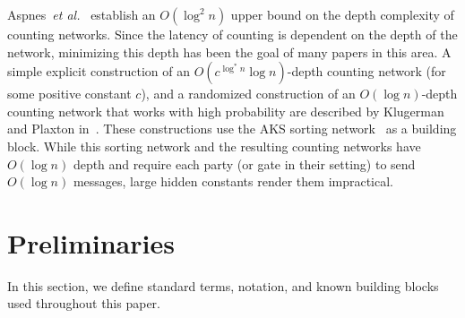 \documentclass[11pt,letter]{article}
\newcommand{\etal}{\emph{et al.}}
\theoremstyle{mytheoremstyle}
\begin{document}
\begin{description}
Aspnes~\etal~\cite{Aspnes:1991:CNM:103418.103421} establish an $O(\log^2 n) $ upper bound on the depth complexity of counting networks. Since the latency of counting is dependent on the depth of the network, minimizing this depth has been the goal of many papers in this area. A simple explicit construction of an $O(c^{ \log^*{n}} \log{n})$-depth counting network (for some positive constant $c$), and a randomized construction of an $O(\log n)$-depth counting network that works with high probability are described by Klugerman and Plaxton in~\cite{Klugerman:1992:SCN:129712.129752,Klugerman:1995:SCN:222428}. These constructions use the AKS sorting network~\cite{Ajtai:1983:SN:800061.808726} as a building block.
While this sorting network and the resulting counting networks have $O(\log{n})$ depth and require each party (or gate in their setting) to send $O(\log{n})$ messages, large hidden constants render them impractical.
\end{description}

\section{Preliminaries}\label{sec:prelim}
In this section, we define standard terms, notation, and known building blocks used throughout this paper.
\end{document}
